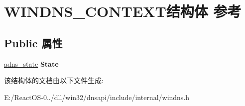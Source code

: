 \hypertarget{struct_w_i_n_d_n_s___c_o_n_t_e_x_t}{}\section{W\+I\+N\+D\+N\+S\+\_\+\+C\+O\+N\+T\+E\+X\+T结构体 参考}
\label{struct_w_i_n_d_n_s___c_o_n_t_e_x_t}
\subsection*{Public 属性}
\begin{DoxyCompactItemize}
\item 
\mbox{\label{struct_w_i_n_d_n_s___c_o_n_t_e_x_t_afdc1bb261d739c62417ee5e873cf7b12}} 
\hyperlink{structadns____state}{adns\+\_\+state} {\bfseries State}
\end{DoxyCompactItemize}


该结构体的文档由以下文件生成\+:\begin{DoxyCompactItemize}
\item 
E\+:/\+React\+O\+S-\/0../dll/win32/dnsapi/include/internal/windns.\+h\end{DoxyCompactItemize}

